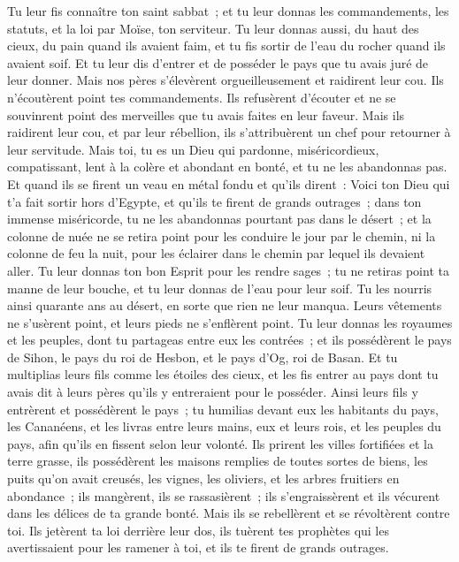 \begin{multicols}{2}
Tu leur fis connaître ton saint sabbat~; et tu leur donnas les commandements, les statuts, et la loi par Moïse, ton serviteur.
Tu leur donnas aussi, du haut des cieux, du pain quand ils avaient faim, et tu fis sortir de l'eau du rocher quand ils avaient soif. Et tu leur dis d'entrer et de posséder le pays que tu avais juré de leur donner.
Mais nos pères s'élevèrent orgueilleusement et raidirent leur cou. Ils n'écoutèrent point tes commandements.
Ils refusèrent d'écouter et ne se souvinrent point des merveilles que tu avais faites en leur faveur. Mais ils raidirent leur cou, et par leur rébellion, ils s'attribuèrent un chef pour retourner à leur servitude. Mais toi, tu es un Dieu qui pardonne, miséricordieux, compatissant, lent à la colère et abondant en bonté, et tu ne les abandonnas pas.
Et quand ils se firent un veau en métal fondu et qu'ils dirent~: Voici ton Dieu qui t'a fait sortir hors d'Egypte, et qu'ils te firent de grands outrages~;
dans ton immense miséricorde, tu ne les abandonnas pourtant pas dans le désert~; et la colonne de nuée ne se retira point pour les conduire le jour par le chemin, ni la colonne de feu la nuit, pour les éclairer dans le chemin par lequel ils devaient aller.
Tu leur donnas ton bon Esprit pour les rendre sages~; tu ne retiras point ta manne de leur bouche, et tu leur donnas de l'eau pour leur soif.
Tu les nourris ainsi quarante ans au désert, en sorte que rien ne leur manqua. Leurs vêtements ne s'usèrent point, et leurs pieds ne s'enflèrent point.
Tu leur donnas les royaumes et les peuples, dont tu partageas entre eux les contrées~; et ils possédèrent le pays de Sihon, le pays du roi de Hesbon, et le pays d'Og, roi de Basan.
Et tu multiplias leurs fils comme les étoiles des cieux, et les fis entrer au pays dont tu avais dit à leurs pères qu'ils y entreraient pour le posséder.
Ainsi leurs fils y entrèrent et possédèrent le pays~; tu humilias devant eux les habitants du pays, les Cananéens, et les livras entre leurs mains, eux et leurs rois, et les peuples du pays, afin qu'ils en fissent selon leur volonté.
Ils prirent les villes fortifiées et la terre grasse, ils possédèrent les maisons remplies de toutes sortes de biens, les puits qu'on avait creusés, les vignes, les oliviers, et les arbres fruitiers en abondance~; ils mangèrent, ils se rassasièrent~; ils s'engraissèrent et ils vécurent dans les délices de ta grande bonté.
Mais ils se rebellèrent et se révoltèrent contre toi. Ils jetèrent ta loi derrière leur dos, ils tuèrent tes prophètes qui les avertissaient pour les ramener à toi, et ils te firent de grands outrages.

\end{multicols}
